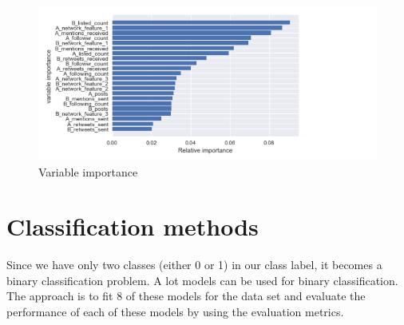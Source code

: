 \documentclass[sigconf]{acmart}
\begin{document}
\begin{figure}
\includegraphics[width=1.0\columnwidth]{images/fig1.png}
\caption{Variable importance }
\label{fig:Fig1}
\end{figure}


\section{Classification methods}
Since we have only two classes (either 0 or 1) in our class label, it becomes a binary classification problem. A lot models can be used for binary classification. The approach is to fit 8 of these models for the data set and evaluate the performance of each of these models by using the evaluation metrics.
\end{document}
